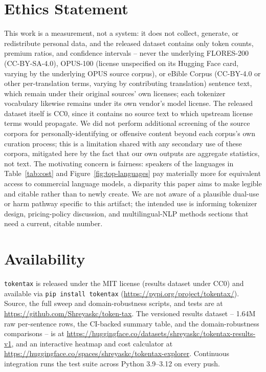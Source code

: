 \documentclass[11pt]{article}
\begin{document}
\section{Ethics Statement}

This work is a measurement, not a system: it does not collect, generate, or
redistribute personal data, and the released dataset contains only token
counts, premium ratios, and confidence intervals -- never the underlying
FLORES-200 (CC-BY-SA-4.0), OPUS-100 (license unspecified on its Hugging
Face card, varying by the underlying OPUS source corpus), or eBible
Corpus (CC-BY-4.0 or other per-translation terms, varying by contributing
translation) sentence
text, which remain under their original sources' own licenses; each
tokenizer vocabulary likewise remains under its own vendor's model license.
The released dataset itself is CC0, since it contains no source text to
which upstream license terms would propagate. We did not perform
additional screening of the source corpora for personally-identifying or
offensive content beyond each corpus's own curation process; this is a
limitation shared with any secondary use of these corpora, mitigated here
by the fact that our own outputs are aggregate statistics, not text. The
motivating concern is fairness:
speakers of the languages in Table~\ref{tab:cost} and
Figure~\ref{fig:top-languages} pay materially more for equivalent access to
commercial language models, a disparity this paper aims to make legible and
citable rather than to newly create. We are not aware of a plausible
dual-use or harm pathway specific to this artifact; the intended use is
informing tokenizer design, pricing-policy discussion, and multilingual-NLP
methods sections that need a current, citable number.

\section{Availability}
\label{sec:availability}

\texttt{tokentax} is released under the MIT license (results dataset under
CC0) and available via \texttt{pip install tokentax}
(\url{https://pypi.org/project/tokentax/}). Source, the full sweep and
domain-robustness scripts, and tests are at
\url{https://github.com/Shreyaskc/token-tax}. The versioned results
dataset -- 1.64M raw per-sentence rows, the CI-backed summary table, and the
domain-robustness comparisons -- is at
\url{https://huggingface.co/datasets/shreyaskc/tokentax-results-v1}, and an
interactive heatmap and cost calculator at
\url{https://huggingface.co/spaces/shreyaskc/tokentax-explorer}. Continuous
integration runs the test suite across Python 3.9--3.12 on every push.
\end{document}
